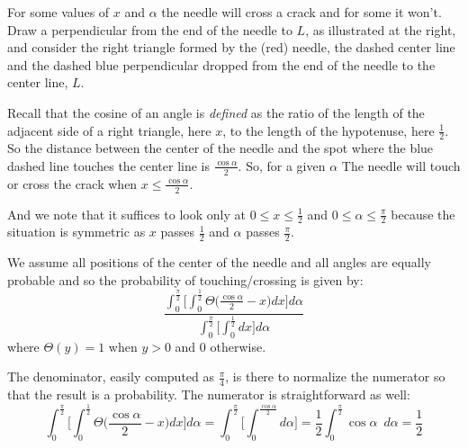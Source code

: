 \documentclass[11pt]{tufte-handout}
\begin{document}
For some values of $x$ and $\alpha$ the needle will cross a crack and for some it won't.  Draw a perpendicular from the end of the needle to $L$, as illustrated at the right, and consider the right triangle formed by the (red) needle, the dashed center line and the dashed blue perpendicular dropped from the end of the needle to the center line, $L$.
\begin{marginfigure}
\end{marginfigure}


Recall that the cosine of an angle is {\it defined}  as the ratio of the length of the adjacent side of a right triangle, here $x$, to the length of the hypotenuse, here $\frac{1}{2}$. So the distance between the center of the needle and the spot where the blue dashed line touches the center line is $\frac{\cos \alpha}{2}$. So, for a given $\alpha$ The needle will touch or cross the crack when $x \leq \frac{\cos\alpha}{2}$. 

And we note that it suffices to look only at $0 \leq x \leq \frac{1}{2}$ and $0 \leq \alpha \leq \frac{\pi}{2}$ because the situation is symmetric as $x$ passes $\frac{1}{2}$ and $\alpha$ passes $\frac{\pi}{2}$. 

We assume all positions of the center of the needle and all angles are equally probable and so the probability of touching/crossing is given by:
\[
\frac
{\int_0^\frac{\pi}{2}\bigg[\int_0^\frac{1}{2}
\Theta\big(\frac{\cos\alpha}{2} - x\big) dx\bigg] d\alpha}
{\int_0^\frac{\pi}{2}\big[\int_0^\frac{1}{2} dx\big] d\alpha}
\]
where $\Theta(y) = 1$ when $y>0$ and $0$ otherwise.

The denominator, easily computed as $\frac{\pi}{4}$, is there to normalize the numerator so that the result is a probability.  The numerator is straightforward as well:
\[
\int_0^\frac{\pi}{2}\bigg[\int_0^\frac{1}{2}
\Theta\big(\frac{\cos\alpha}{2} - x\big) dx\bigg] d\alpha
=
\int_0^\frac{\pi}{2}\bigg[\int_0^{\frac{\cos\alpha}{2}}d\alpha\bigg]
=
\frac{1}{2}\int_0^\frac{\pi}{2}\cos\alpha \enspace d\alpha
=\frac{1}{2}
\]
\end{document}
